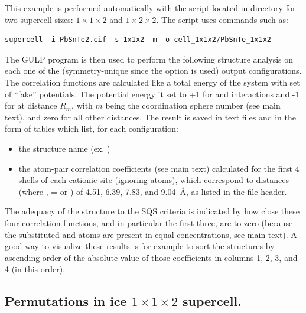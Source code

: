 \documentclass[a4paper,10pt]{article}
\begin{document}
This example is performed automatically with the script  located in directory  for two supercell sizes: $1\times1\times2$ and $1\times2\times2$. The script uses \sups{} commands such as:
\begin{Verbatim}[breaklines]
  supercell -i PbSnTe2.cif -s 1x1x2 -m -o cell_1x1x2/PbSnTe_1x1x2
\end{Verbatim}
The GULP program is then used to perform the following structure analysis on each one of the (symmetry-unique since the  option is used) output configurations. The correlation functions are calculated like a total energy of the system with set of ``fake'' potentials. The potential energy it set to +1 for  and  interactions and -1 for  at distance $R_m$, with $m$ being the coordination sphere number (see main text), and zero for all other distances. The result is saved in text files  and  in the form of tables which list, for each configuration:
\begin{itemize}
 \item the structure name (ex. )
 \item the atom-pair correlation coefficients (see main text) calculated for the first 4 shells of each cationic site (ignoring  atoms), which correspond to  distances (where ,  =  or ) of 4.51, 6.39, 7.83, and 9.04~\AA, as listed in the file header.
\end{itemize}
The adequacy of the structure to the SQS criteria is indicated by how close these four correlation functions, and in particular the first three, are to zero (because the substituted  and  atoms are present in equal concentrations, see main text). A good way to visualize these results is for example to sort the structures by ascending order of the absolute value of those coefficients in columns 1, 2, 3, and 4 (in this order).

\subsection*{Permutations in ice  $1\times1\times2$ supercell.}
\end{document}

